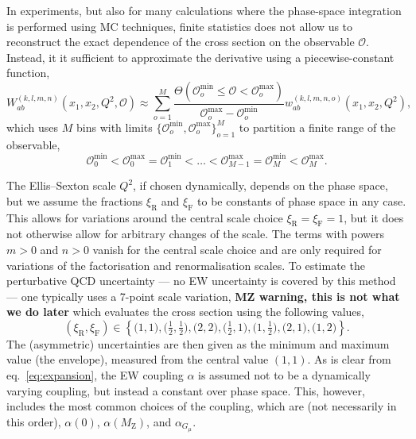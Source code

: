 In experiments, but also for many calculations where the phase-space integration is performed using MC techniques, finite statistics does not allow us to reconstruct the exact dependence of the cross section on the observable $\mathcal{O}$.
Instead, it it sufficient to approximate the derivative using a piecewise-constant function,
\begin{equation}
W_{ab}^{(k,l,m,n)} \left( x_1, x_2, Q^2, \mathcal{O} \right) \approx \sum_{o=1}^M \frac{\Theta (\mathcal{O}_o^\mathrm{min} \le \mathcal{O} < \mathcal{O}_o^\mathrm{max})}{\mathcal{O}_o^\mathrm{max} - \mathcal{O}_o^\mathrm{min}} w_{ab}^{(k,l,m,n,o)} \left( x_1, x_2, Q^2 \right) \text{,}
\end{equation}
which uses $M$ bins with limits $\{ \mathcal{O}_o^\mathrm{min}, \mathcal{O}_o^\mathrm{max} \}_{o=1}^M$ to partition a finite range of the observable,
\begin{equation}
\mathcal{O}_0^\mathrm{min} < \mathcal{O}_0^\mathrm{max} = \mathcal{O}_1^\mathrm{min} < \ldots < \mathcal{O}_{M-1}^\mathrm{max} = \mathcal{O}_M^\mathrm{min} < \mathcal{O}_M^\mathrm{max} \text{.}
\label{eq:bins-of-diff-xsection}
\end{equation}

The Ellis--Sexton scale $Q^2$, if chosen dynamically, depends on the phase space, but we assume the fractions $\xi_\mathrm{R}$ and $\xi_\mathrm{F}$ to be constants of phase space in any case.
This allows for variations around the central scale choice $\xi_\mathrm{R} = \xi_\mathrm{F} = 1$, but it does not otherwise allow for arbitrary changes of the scale.
The terms with powers $m > 0$ and $n > 0$ vanish for the central scale choice and are only required for variations of the factorisation and renormalisation scales.
To estimate the perturbative QCD uncertainty --- no EW uncertainty is covered by this method --- one typically uses a 7-point scale variation, {\bf MZ warning, this is not what we do later} which evaluates the cross section using the following values,
\begin{equation}
(\xi_\mathrm{R}, \xi_\mathrm{F}) \in \left\{ \bigl( 1, 1 \bigr), \bigl( \tfrac{1}{2}, \tfrac{1}{2} \bigr), \bigl( 2, 2 \bigr), \bigl( \tfrac{1}{2}, 1 \bigr), \bigl( 1, \tfrac{1}{2} \bigr), \bigl( 2, 1 \bigr), \bigl( 1, 2 \bigr) \right\} \text{.}
\end{equation}
The (asymmetric) uncertainties are then given as the minimum and maximum value (the envelope), measured from the central value $(1, 1)$.
As is clear from eq.~\eqref{eq:expansion}, the EW coupling $\alpha$ is assumed not to be a dynamically varying coupling, but instead a constant over phase space.
This, however, includes the most common choices of the coupling, which are (not necessarily in this order), $\alpha (0)$, $\alpha (M_\mathrm{Z})$, and $\alpha_{G_\mu}$.

